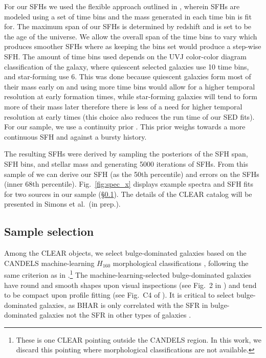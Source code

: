 \documentclass[twocolumn,twocolappendix,times]{aastex63}
\newcommand{\mstar}{M_{\star}} %
\begin{document}
\begin{CJK*}{UTF8}{gbsn}
For our SFHs we used the flexible approach outlined in 
\cite{leja19}, wherein SFHs are modeled using a set of time bins and the mass generated in each time bin
is fit for. The maximum span of our SFHs is determined by redshift and is set to be the age of the universe.
We allow the overall span of the time bins to vary which produces smoother SFHs where as keeping the bins set would
produce a step-wise SFH. The amount of time bins used depends on the UVJ color-color diagram classification of
the galaxy, where quiescent selected galaxies use 10 time bins, and star-forming use 6. This was done because
quiescent galaxies form most of their mass early on and using more time bins would allow for a higher temporal
resolution at early formation times, while  star-forming galaxies will tend to form more of their mass later
therefore there is less of a need for higher temporal resolution at early times (this choice also reduces the
run time of our SED fits). For our sample, we use a continuity prior \citep{leja19}. This prior weighs 
towards a more continuous SFH and against a bursty history. 

The resulting SFHs were derived by sampling the 
posteriors of the SFH span, SFH bins, and stellar mass and generating 5000 iterations of SFHs. From this sample 
of we can derive our SFH (as the 50th percentile) and errors on the SFHs (inner 68th percentile).
Fig.~\ref{fig:spec_x} displays example spectra and SFH fits for two sources in our sample (\S\ref{sec:sample}).
The details of the CLEAR catalog will be presented in Simons et al.\ (in prep.). 

\subsection{Sample selection}
\label{sec:sample}
Among the CLEAR objects, we select bulge-dominated 
galaxies based on the CANDELS machine-learning $H_{160}$ morphological 
classifications \citep{huertas_company15}, following the 
same criterion as in \cite{yang19}.\footnote{These is 
one CLEAR pointing outside the CANDELS region.
In this work, we discard this pointing where morphological 
classifications are not available.}
The machine-learning-selected bulge-dominated galaxies have round 
and smooth shapes upon visual inspections (see Fig.~2 in 
\citealt{yang19}) and tend to be compact upon profile fitting
(see Fig.~C4 of \citealt{ni21}).
It is critical to select bulge-dominated galaxies, as BHAR
is only correlated with the SFR in bulge-dominated galaxies 
not the SFR in other types of galaxies \citep{yang19}.


\end{CJK*}
\end{document}
